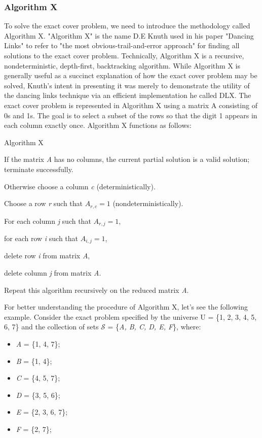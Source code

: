 \documentclass{mcmthesis}
\begin{document}
\subsubsection{Algorithm X}
To solve the exact cover problem, we need to introduce the methodology called Algorithm X. "Algorithm X" is the name D.E Knuth used in his paper "Dancing Links" to refer to "the most obvious-trail-and-error approach" for finding all solutions to the exact cover problem. Technically, Algorithm X is a recursive, nondeterministic, depth-first, backtracking algorithm. While Algorithm X is generally useful as a succinct explanation of how the exact cover problem may be solved, Knuth's intent in presenting it was merely to demonstrate the utility of the dancing links technique via an efficient implementation he called DLX.\newline
\indent The exact cover problem is represented in Algorithm X using a matrix A consisting of 0s and 1s. The goal is to select a subset of the rows so that the digit 1 appears in each column exactly once. Algorithm X functions as follows:\\
\begin{framed}
\begin{list}{.}
    {\setlength{\parsep}{0ex}\setlength{\itemsep}{0ex}}
\item[] Algorithm X
\item   If the matrix \textit{A} has no columns, the current partial solution is a valid solution; terminate successfully.
\item   Otherwise choose a column \textit{c} (deterministically).
\item 	Choose a row \textit{r} such that $A_{r, c} = 1$ (nondeterministically).
\item For each column \textit{j} such that $A_{r, j} = 1$, 
\item[] \qquad for each row \textit{i} such that $A_{i,j} = 1$,
\item[] \qquad \qquad delete row \textit{i} from matrix \textit{A},
\item[] \qquad delete column \textit{j} from matrix \textit{A}.
\item Repeat this algorithm recursively on the reduced matrix \textit{A}.
\end{list}
\end{framed}

For better understanding the procedure of Algorithm X, let's see the following example. Consider the exact problem specified by the universe U = \{1, 2, 3, 4, 5, 6, 7\} and the collection of sets $\mathcal{S}$ = \{\textit{A, B, C, D, E, F}\}, where:
\begin{itemize}
	\item \textit{A} = \{1, 4, 7\};
	\item \textit{B} = \{1, 4\};
	\item \textit{C} = \{4, 5, 7\};
	\item \textit{D} = \{3, 5, 6\};
	\item \textit{E} = \{2, 3, 6, 7\};
	\item \textit{F} = \{2, 7\};
\end{itemize}
\end{document}
